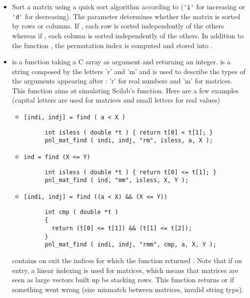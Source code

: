 \begin{itemize}
\item {}
  \sshortdescribe Sort a matrix using a quick sort algorithm according to
   (\verb!'i'! for increasing or \verb!'d'! for decreasing). The
  parameter  determines whether the matrix is sorted by rows or
  columns. If , each row is sorted independently of the others
  whereas if , each column is sorted independently of the
  others. In addition to the function , the permutation
  index is computed and stored into .

\item {}
  \sshortdescribe {} is a function taking a C array as argument and
  returning an integer.  is a string composed by the letters 'r' and
  'm' and is used to describe the types of the arguments appearing after 
  : 'r' for real numbers and 'm' for matrices.
  This function aims at simulating Scilab's 
  function. Here are a few examples (capital letters are used for matrices and
  small letters for real values)
  \begin{itemize}
    \item \verb![indi, indj] = find ( a < X )!
      \begin{verbatim}
      int isless ( double *t ) { return t[0] < t[1]; }
      pnl_mat_find ( indi, indj, "rm", isless, a, X );
      \end{verbatim}
    \item \verb!ind = find (X <= Y)!
      \begin{verbatim}
      int isless ( double *t ) { return t[0] <= t[1]; }
      pnl_mat_find ( ind, "mm", isless, X, Y );
      \end{verbatim}
    \item \verb![indi, indj] = find ((a < X) && (X <= Y))!
      \begin{verbatim}
      int cmp ( double *t ) 
      { 
        return (t[0] <= t[1]) && (t[1] <= t[2]); 
      }
      pnl_mat_find ( indi, indj, "rmm", cmp, a, X, Y );
      \end{verbatim}
  \end{itemize}
   contains on exit the indices  for which the function 
  returned . Note that if  on entry, a linear indexing
  is used for matrices, which means that matrices are seen as large vectors
  built up be stacking rows. This function returns  or  if
  something went wrong (size mismatch between matrices, invalid string type).
\end{itemize}


